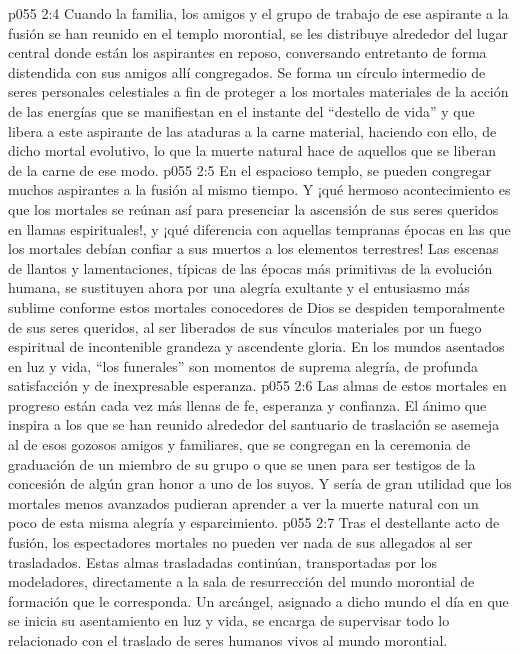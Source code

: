 \vs p055 2:4 \pc Cuando la familia, los amigos y el grupo de trabajo de ese aspirante a la fusión se han reunido en el templo morontial, se les distribuye alrededor del lugar central donde están los aspirantes en reposo, conversando entretanto de forma distendida con sus amigos allí congregados. Se forma un círculo intermedio de seres personales celestiales a fin de proteger a los mortales materiales de la acción de las energías que se manifiestan en el instante del “destello de vida” y que libera a este aspirante de las ataduras a la carne material, haciendo con ello, de dicho mortal evolutivo, lo que la muerte natural hace de aquellos que se liberan de la carne de ese modo.
\vs p055 2:5 En el espacioso templo, se pueden congregar muchos aspirantes a la fusión al mismo tiempo. Y ¡qué hermoso acontecimiento es que los mortales se reúnan así para presenciar la ascensión de sus seres queridos en llamas espirituales!, y ¡qué diferencia con aquellas tempranas épocas en las que los mortales debían confiar a sus muertos a los elementos terrestres! Las escenas de llantos y lamentaciones, típicas de las épocas más primitivas de la evolución humana, se sustituyen ahora por una alegría exultante y el entusiasmo más sublime conforme estos mortales conocedores de Dios se despiden temporalmente de sus seres queridos, al ser liberados de sus vínculos materiales por un fuego espiritual de incontenible grandeza y ascendente gloria. En los mundos asentados en luz y vida, “los funerales” son momentos de suprema alegría, de profunda satisfacción y de inexpresable esperanza.
\vs p055 2:6 Las almas de estos mortales en progreso están cada vez más llenas de fe, esperanza y confianza. El ánimo que inspira a los que se han reunido alrededor del santuario de traslación se asemeja al de esos gozosos amigos y familiares, que se congregan en la ceremonia de graduación de un miembro de su grupo o que se unen para ser testigos de la concesión de algún gran honor a uno de los suyos. Y sería de gran utilidad que los mortales menos avanzados pudieran aprender a ver la muerte natural con un poco de esta misma alegría y esparcimiento.
\vs p055 2:7 \pc Tras el destellante acto de fusión, los espectadores mortales no pueden ver nada de sus allegados al ser trasladados. Estas almas trasladadas continúan, transportadas por los modeladores, directamente a la sala de resurrección del mundo morontial de formación que le corresponda. Un arcángel, asignado a dicho mundo el día en que se inicia su asentamiento en luz y vida, se encarga de supervisar todo lo relacionado con el traslado de seres humanos vivos al mundo morontial.
